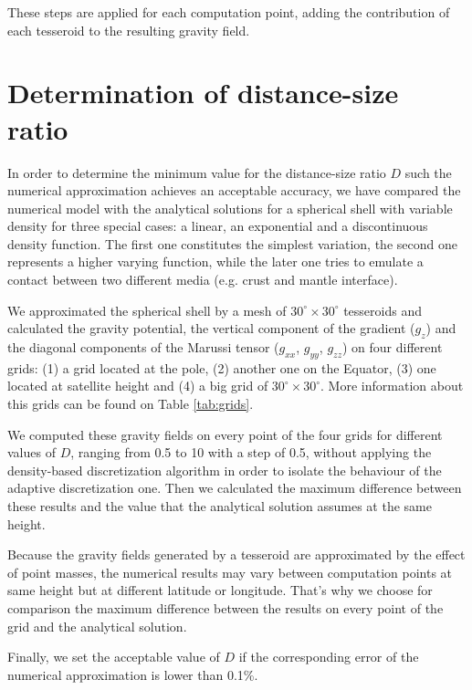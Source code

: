 \documentclass[extra]{gji}
\begin{document}
These steps are applied for each computation point, adding the contribution of each tesseroid to the resulting gravity field.


\section{Determination of distance-size ratio}

In order to determine the minimum value for the distance-size ratio $D$ such the numerical approximation achieves an acceptable accuracy, we have compared the numerical model with the analytical solutions for a spherical shell with variable density for three special cases: a linear, an exponential and a discontinuous density function.
The first one constitutes the simplest variation, the second one represents a higher varying function, while the later one tries to emulate a contact between two different media (e.g. crust and mantle interface).

We approximated the spherical shell by a mesh of $30^\circ \times 30^\circ$ tesseroids and calculated the gravity potential, the vertical component of the gradient ($g_z$) and the diagonal components of the Marussi tensor ($g_{xx}$, $g_{yy}$, $g_{zz}$) on four different grids: (1) a grid located at the pole, (2) another one on the Equator, (3) one located at satellite height and (4) a big grid of $30^\circ \times 30^\circ$.
More information about this grids can be found on Table \ref{tab:grids}.

We computed these gravity fields on every point of the four grids for different values of $D$, ranging from 0.5 to 10 with a step of 0.5, without applying the density-based discretization algorithm in order to isolate the behaviour of the adaptive discretization one.
Then we calculated the maximum difference between these results and the value that the analytical solution assumes at the same height.

Because the gravity fields generated by a tesseroid are approximated by the effect of point masses, the numerical results may vary between computation points at same height but at different latitude or longitude.
That's why we choose for comparison the maximum difference between the results on every point of the grid and the analytical solution.

Finally, we set the acceptable value of $D$ if the corresponding error of the numerical approximation is lower than 0.1\%.
\end{document}
